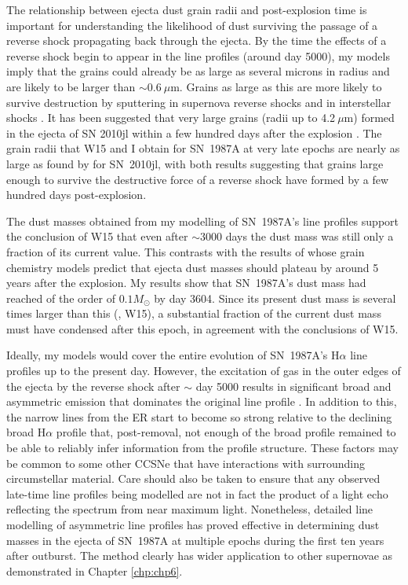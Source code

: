 The relationship between ejecta dust grain radii and post-explosion 
time is important for understanding the likelihood of dust surviving the 
passage of a reverse shock propagating back through the ejecta. By the 
time the effects of a reverse shock begin to appear in the line profiles 
(around day 5000), my models imply that the grains could already be as 
large as several microns in radius and are likely to be larger than $\sim 
0.6~\mu$m. Grains as large as this are more likely to survive destruction 
by sputtering in supernova reverse shocks and in interstellar shocks 
\citep{Silvia2010, Silvia2012, Slavin2015}.
It has been suggested that very large grains (radii up to 4.2$~\mu$m) 
formed in the ejecta of SN 2010jl within a few hundred days after the 
explosion \citep{Gall2014}. The grain radii that W15 and I obtain 
for SN~1987A at very late epochs are nearly as large as found by 
\citet{Gall2014} for SN~2010jl, with both results suggesting that grains 
large enough to survive the destructive force of a reverse shock have 
formed by a few hundred days post-explosion. 

The dust masses obtained from my modelling of SN~1987A's line profiles 
support the conclusion of W15 that even after $\sim$3000 days the dust 
mass was still only a fraction of its current value. This contrasts with 
the results of \citet{Sarangi2015} whose grain chemistry models predict 
that ejecta dust masses should plateau by around 5 years after the 
explosion. My results show that SN~1987A's dust mass had reached of 
the order of $0.1M_{\odot}$ by day 3604.  Since its present dust mass is 
several times larger than this (\citealt{Matsuura2015}, W15), a 
substantial fraction of the current dust mass must have condensed after 
this epoch, in agreement with the conclusions of W15.

Ideally, my models would cover the entire evolution of SN~1987A's 
H$\alpha$ line profiles up to the present day.  However, the excitation of 
gas in the outer edges of the ejecta by the reverse shock after $\sim$ day 
5000 results in significant broad and asymmetric emission that 
dominates the original line profile \citep{Fransson2013}.  In addition to 
this, the narrow lines from the ER start to become so 
strong relative to the declining broad H$\alpha$ profile that, 
post-removal, not enough of the broad profile remained to be 
able to reliably infer information from the profile structure. These 
factors may be 
common to some other CCSNe that have interactions with surrounding 
circumstellar material. Care should also be taken to ensure that any 
observed late-time line profiles being modelled are not in fact the 
product of a light echo reflecting the spectrum from near maximum light. 
Nonetheless, detailed line modelling of asymmetric line profiles has 
proved effective in determining dust masses in the ejecta of SN~1987A at 
multiple epochs during the first ten years after outburst. The method 
clearly has wider application to other supernovae as demonstrated in Chapter \ref{chp:chp6}.


